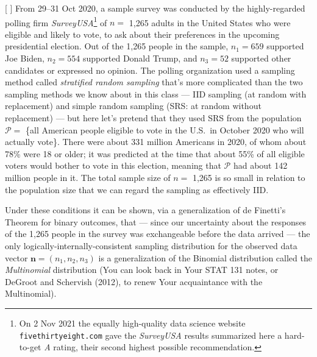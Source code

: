 \documentclass[12pt]{article}
\begin{document}
[ \textit{} ] \vspace*{0.025in} From 29--31 Oct 2020, a sample survey was conducted by the highly-regarded polling firm \textit{SurveyUSA}\footnote{On 2 Nov 2021 the equally high-quality data science website \texttt{fivethirtyeight.com} gave the \textit{SurveyUSA} results summarized here a hard-to-get \textit{A} rating, their second highest possible recommendation.} of $n =$ 1,265 adults in the United States who were eligible and likely to vote, to ask about their preferences in the upcoming presidential election. Out of the 1,265 people in the sample, $n_1 = 659$ supported Joe Biden, $n_2 = 554$ supported Donald Trump, and $n_3 = 52$ supported other candidates or expressed no opinion. The polling organization used a sampling method called \textit{stratified random sampling} that's more complicated than the two sampling methods we know about in this class --- IID sampling (at random with replacement) and simple random sampling (SRS: at random without replacement) --- but here let's pretend that they used SRS from the population $\mathcal{ P } =$ \{all American people eligible to vote in the U.S.~in October 2020 who will actually vote\}. There were about 331 million Americans in 2020, of whom about 78\% were 18 or older; it was predicted at the time that about 55\% of all eligible voters would bother to vote in this election, meaning that $\mathcal{ P }$ had about 
142 million people in it. The total sample size of $n =$ 1,265 is so small in relation to the population size that we can regard the sampling as effectively IID.

Under these conditions it can be shown, via a generalization of de Finetti's Theorem for binary outcomes, that --- since our uncertainty about the responses of the 1,265 people in the survey was exchangeable before the data arrived --- the only logically-internally-consistent sampling distribution for the observed  data vector $\bm{ n } = ( n_1, n_2, n_3 )$ is a generalization of the Binomial distribution called the \textit{Multinomial} distribution (You can look back in Your STAT 131 notes, or DeGroot and Schervish (2012), to renew Your acquaintance with the Multinomial). 
\end{document}
